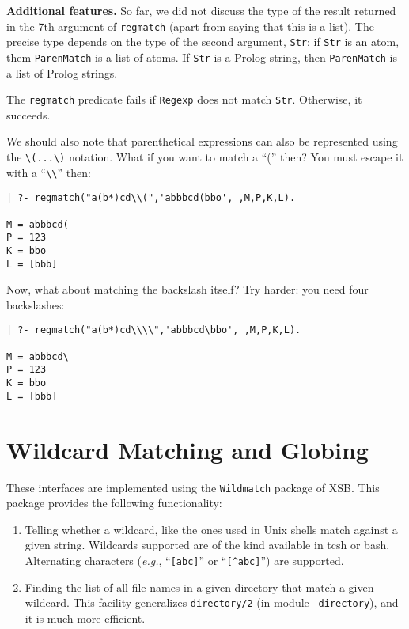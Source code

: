 {\bf Additional features.} So far, we did not discuss the type of the
result returned in the 7th argument of {\tt regmatch} (apart from saying
that this is a list). The precise type depends on the type of the second
argument, {\tt Str}: if {\tt Str} is an atom, them {\tt ParenMatch} is a
list of atoms. If {\tt Str} is a Prolog string, then {\tt ParenMatch} is a
list of Prolog strings.

The {\tt regmatch} predicate fails if {\tt Regexp} does not match {\tt Str}.
Otherwise, it succeeds.

We should also note that parenthetical expressions can also be represented
using the \verb|\(...\)| notation. What if you want to match a ``('' then?
You must escape it with a ``\verb|\\|'' then:
\begin{verbatim}
| ?- regmatch("a(b*)cd\\(",'abbbcd(bbo',_,M,P,K,L).

M = abbbcd(
P = 123
K = bbo
L = [bbb]
\end{verbatim}
Now, what about matching the backslash itself? Try harder: you need four
backslashes: 
\begin{verbatim}
| ?- regmatch("a(b*)cd\\\\",'abbbcd\bbo',_,M,P,K,L).

M = abbbcd\
P = 123
K = bbo
L = [bbb]  
\end{verbatim}

\section{Wildcard Matching and Globing}

These interfaces are implemented using the {\tt Wildmatch} package of XSB.
This package provides the following functionality: 
\begin{enumerate}
\item Telling whether a wildcard, like the ones used in Unix shells match
  against a given string. Wildcards supported are of the kind available in
  tcsh or bash. Alternating characters ({\it e.g.}, ``\verb|[abc]|'' or
  ``\verb|[^abc]|'') are supported.
\item Finding the list of all file names in a given directory that match a
  given wildcard. This facility generalizes {\tt directory/2} (in module {\tt
    directory}), and it is much more efficient.
\end{enumerate}

